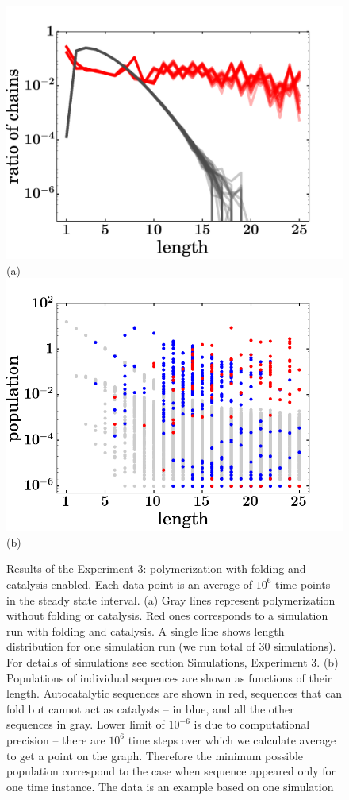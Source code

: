 \documentclass[journal=jacsat,manuscript=article,layout=twocolumn]{achemso}
\begin{document}
\begin{figure}[htb!]
  \centering
  \includegraphics[width=0.9\columnwidth]{pictures/distrHP-plain-many.pdf}(a) 
  \includegraphics[width=0.9\columnwidth]{pictures/scatter1837.png}(b) 
  \caption{\footnotesize{Results of the Experiment 3: polymerization with folding and catalysis 
enabled. Each data point is an average of 
$10^6$ time points in the steady state interval. (a) Gray lines represent polymerization without 
folding or catalysis. Red ones corresponds to a simulation run with folding and catalysis. A single 
line shows length distribution for one simulation run (we run total of 30 simulations). For details 
of simulations see section Simulations, Experiment 3. (b) Populations of individual sequences are 
shown as 
functions of their length. Autocatalytic sequences are shown in red, sequences that can fold but 
cannot act as  catalysts -- in blue, and all the other sequences in gray. Lower limit of $10^{-6}$ 
is due to computational precision -- there are $10^6$ time steps over which we calculate average to 
get a point on the graph. Therefore the minimum possible population correspond to the case when 
sequence appeared only for one time instance. The data is an example based on one simulation}}
  \label{fig:stats-scatter-018}
\end{figure}
\end{document}
